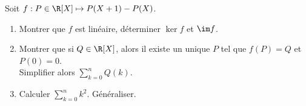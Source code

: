 \begin{enonce}
\begin{exercise}[ID={RMS 122-2 E1310 ENSEA PC},subtitle={},tags={}]
Soit $f:P\in\R[X]\mapsto P(X+1)-P(X)$.
\begin{enumerate}
  \item Montrer que $f$ est linéaire, déterminer $\ker f$ et $\im f$.
  \item Montrer que si $Q\in\R[X]$, alors il existe un unique $P$ tel que $f(P)=Q$ et $P(0)=0$.\\
    Simplifier alors $\sum\limits_{k=0}^n Q(k)$.
  \item Calculer $\sum\limits_{k=0}^n k^2$. Généraliser.
\end{enumerate}
\end{exercise}
\begin{solution}
\end{solution}
\end{enonce}
